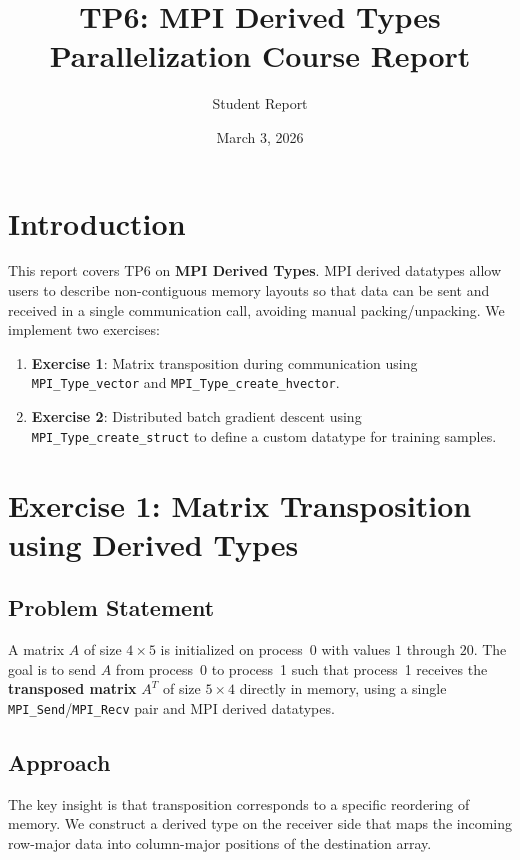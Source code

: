 \documentclass[11pt,a4paper]{article}
\title{\textbf{TP6: MPI Derived Types} \\ \large Parallelization Course Report}
\author{Student Report}
\date{March 3, 2026}
\begin{document}
\maketitle
\tableofcontents
\newpage

\section{Introduction}

This report covers TP6 on \textbf{MPI Derived Types}. MPI derived datatypes allow users to describe non-contiguous memory layouts so that data can be sent and received in a single communication call, avoiding manual packing/unpacking. We implement two exercises:

\begin{enumerate}
    \item \textbf{Exercise 1}: Matrix transposition during communication using \texttt{MPI\_Type\_vector} and \texttt{MPI\_Type\_create\_hvector}.
    \item \textbf{Exercise 2}: Distributed batch gradient descent using \texttt{MPI\_Type\_create\_struct} to define a custom datatype for training samples.
\end{enumerate}

\section{Exercise 1: Matrix Transposition using Derived Types}

\subsection{Problem Statement}

A matrix $A$ of size $4 \times 5$ is initialized on process~0 with values $1$ through $20$. The goal is to send $A$ from process~0 to process~1 such that process~1 receives the \textbf{transposed matrix} $A^T$ of size $5 \times 4$ directly in memory, using a single \texttt{MPI\_Send}/\texttt{MPI\_Recv} pair and MPI derived datatypes.

\subsection{Approach}

The key insight is that transposition corresponds to a specific reordering of memory. We construct a derived type on the receiver side that maps the incoming row-major data into column-major positions of the destination array.
\end{document}
